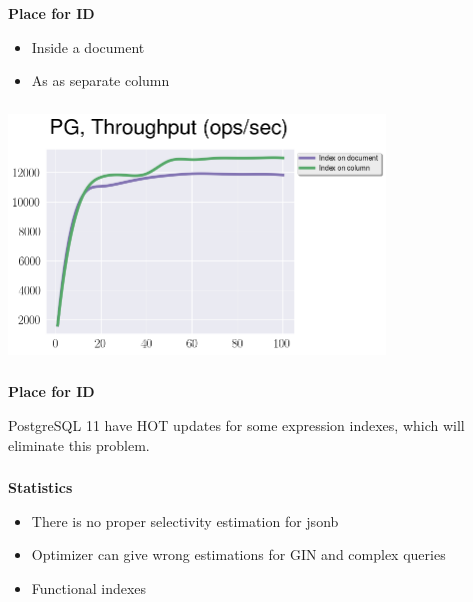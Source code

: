 \documentclass[usenames,dvipsnames, 18pt, compress, aspectratio=169]{beamer}
\begin{document}
\begin{frame}
    \frametitle{}
    \begin{center}
        \textbf{Place for ID}

        \begin{itemize}[label={\MVRightarrow}]
            \item Inside a document
            \item As as separate column
        \end{itemize}

    \end{center}
\end{frame}

\begin{frame}
    \frametitle{}
    \begin{center}

        \includegraphics[width=0.75\textwidth,center]{pg_id_place.png}

    \end{center}
\end{frame}

\begin{frame}
    \frametitle{}
    \begin{center}
        \textbf{Place for ID}

        \begin{flushleft}
            PostgreSQL 11 have HOT updates for some expression indexes, which will
            eliminate this problem.
        \end{flushleft}

    \end{center}
\end{frame}

\begin{frame}
    \frametitle{}
    \begin{center}
    \textbf{Statistics}

        \begin{itemize}[label={\MVRightarrow}]
            \item There is no proper selectivity estimation for jsonb
            \item Optimizer can give wrong estimations for GIN and complex queries
            \item Functional indexes
        \end{itemize}

    \end{center}
\end{frame}
\end{document}
